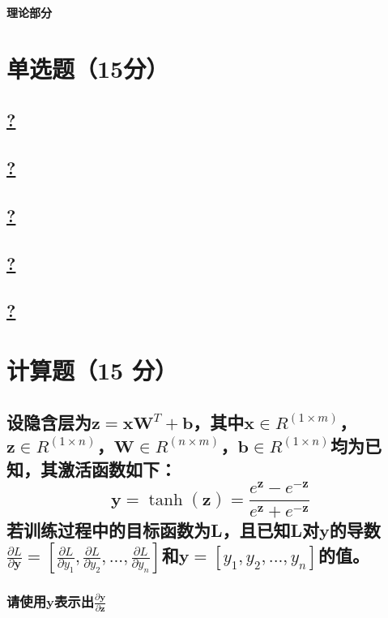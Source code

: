 \documentclass[a4paper]{article}
\begin{document}
\courseheader
{}
\vspace{3mm}
\centerline{\textbf{\Large{理论部分}}}

\section{单选题（15分）}
\subsection{\underline{?}}

\subsection{\underline{?}}

\subsection{\underline{?}}

\subsection{\underline{?}}

\subsection{\underline{?}}

\section{计算题（15 分）}
\subsection{设隐含层为$\mathbf{z}=\mathbf{x}\mathbf{W}^T+\mathbf{b}$，其中$\mathbf{x}\in R^{(1 \times m)}$，$\mathbf{z}\in R^{(1\times n)}$，$\mathbf{W}\in R^{(n\times m)}$，$\mathbf{b} \in R^{(1\times n)}$均为已知，其激活函数如下：
$$\mathbf{y}=\tanh(\mathbf{z})=\frac{e^\mathbf{z}-e^{-\mathbf{z}}}{e^\mathbf{z}+e^{-\mathbf{z}}}$$
若训练过程中的目标函数为L，且已知L对$\mathbf{y}$的导数 $\frac{\partial L}{\partial \mathbf{y}}=[\frac{\partial L}{\partial y_1},\frac{\partial L}{\partial y_2},...,\frac{\partial L}{\partial y_n}]$和$\mathbf{y}=[y_1,y_2,...,y_n]$的值。
}
\subsubsection{请使用$\mathbf{y}$表示出$\frac{\partial \mathbf{y}}{\partial \mathbf{z}}$
}
\end{document}
